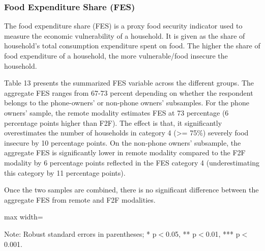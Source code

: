 \documentclass[11pt,harvard]{article}
\begin{document}
\subsubsection{Food Expenditure Share (FES)}
	
The food expenditure share (FES) is a proxy food security indicator used to measure the economic vulnerability of a household. It is given as the share of household's total consumption expenditure spent on food. The higher the share of food expenditure of a household, the more vulnerable/food insecure the household.

Table 13 presents the summarized FES variable across the different groups. The aggregate FES ranges from 67-73 percent depending on whether the respondent belongs to the phone-owners' or non-phone owners' subsamples. For the phone owners' sample, the remote modality estimates FES at 73  percentage (6 percentage points higher than F2F). The effect is that, it significantly overestimates the number of households in category 4 (>= 75\%) severely food insecure by 10 percentage points. On the non-phone owners' subsample, the aggregate FES is significantly lower in remote modality compared to the F2F modality by 6 percentage points reflected in the FES category 4 (underestimating this category by 11 percentage points).

Once the two samples are combined, there is no significant difference between the aggregate FES from remote and F2F modalities.  
	
	\begin{table}[htbp]
		\centering
		\begin{adjustbox}{max width=\textwidth}
			\begin{threeparttable}
				\caption{Impact of Survey Modality on Expenditure and Food Expenditure Share}
				\scriptsize
				 
				\label{tab:FES_Modality_CAR}
				\begin{tablenotes}
					\item Note: Robust standard errors in parentheses; * p$<$0.05, ** p$<$0.01, *** p$<$0.001.
				\end{tablenotes}
			\end{threeparttable}
		\end{adjustbox}
	\end{table}
	
	
\end{document}
